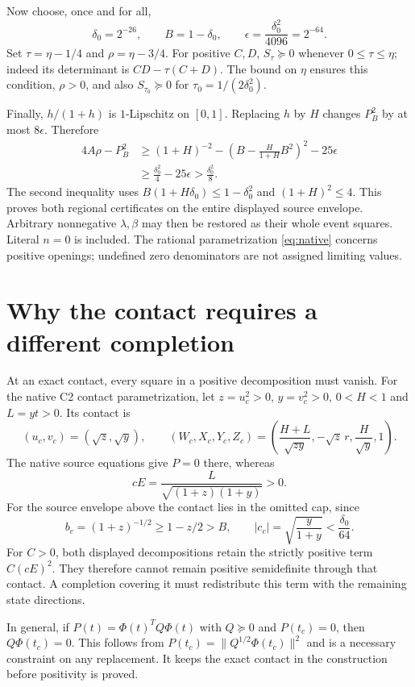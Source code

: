 \documentclass[10pt]{article}
\begin{document}
Now choose, once and for all,
\[
 \delta_0=2^{-26},\qquad B=1-\delta_0,\qquad
 \epsilon=\frac{\delta_0^2}{4096}=2^{-64}.
\]
Set $\tau=\eta-1/4$ and $\rho=\eta-3/4$.
For positive $C,D$, $S_\tau\succeq0$ whenever $0\leq\tau\leq\eta$;
indeed its determinant is $CD-\tau(C+D)$.
The bound on $\eta$ ensures this condition, $\rho>0$, and also
$S_{\tau_0}\succeq0$ for $\tau_0=1/(2\delta_0^2)$.

Finally, $h/(1+h)$ is $1$-Lipschitz on $[0,1]$. Replacing $h$ by
$H$ changes $P_B^2$ by at most $8\epsilon$. Therefore
\begin{align*}
 4A\rho-P_B^2
 &\geq(1+H)^{-2}
       -\left(B-\frac{H}{1+H}B^2\right)^2-25\epsilon\\
 &\geq\frac{\delta_0^2}{4}-25\epsilon
   >\frac{\delta_0^2}{8}.
\end{align*}
The second inequality uses
$B(1+H\delta_0)\leq1-\delta_0^2$ and $(1+H)^2\leq4$.
This proves both regional certificates on the entire displayed source
envelope. Arbitrary nonnegative $\lambda,\beta$ may then be restored as
their whole event squares. Literal $n=0$ is included. The rational
parametrization \eqref{eq:native} concerns positive openings; undefined
zero denominators are not assigned limiting values.


\section{Why the contact requires a different completion}

At an exact contact, every square in a positive decomposition must vanish.
For the native C2 contact parametrization, let
$z=u_c^2>0$, $y=v_c^2>0$, $0<H<1$ and $L=yt>0$. Its contact is
\[
 (u_c,v_c)=(\sqrt z,\sqrt y),\qquad
 (W_c,X_c,Y_c,Z_c)=
 \left(\frac{H+L}{\sqrt{zy}},-\sqrt z\,r,\frac H{\sqrt y},1\right).
\]
The native source equations give $P=0$ there, whereas
\[
 cE=\frac{L}{\sqrt{(1+z)(1+y)}}>0.
\]
For the source envelope above the contact lies in the omitted cap, since
\[
 b_c=(1+z)^{-1/2}\geq1-z/2>B,\qquad
 |c_c|=\sqrt{\frac{y}{1+y}}<\frac{\delta_0}{64}.
\]
For $C>0$, both displayed decompositions retain the strictly positive
term $C(cE)^2$. They therefore cannot remain positive semidefinite
through that contact. A completion covering it must redistribute this
term with the remaining state directions.

In general, if $P(t)=\Phi(t)^TQ\Phi(t)$ with $Q\succeq0$ and
$P(t_c)=0$, then $Q\Phi(t_c)=0$. This follows from
$P(t_c)=\|Q^{1/2}\Phi(t_c)\|^2$ and is a necessary constraint on any
replacement. It keeps the exact contact in the construction before
positivity is proved.
\end{document}
